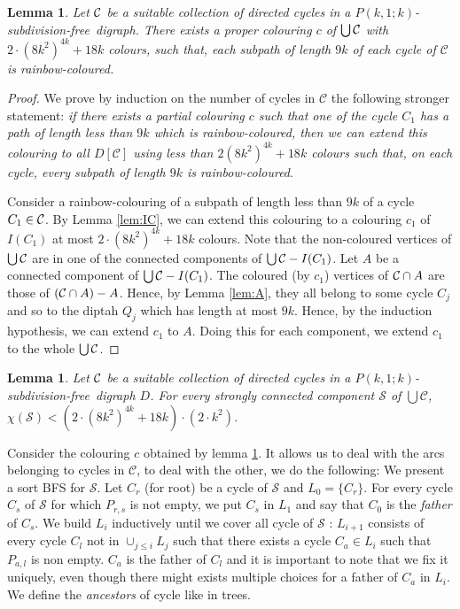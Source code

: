 \documentclass[utf8,11pt]{article}
\theoremstyle{plain}
\newtheorem{lemma}[theorem]{Lemma}
\theoremstyle{definition}
\theoremstyle{remark}
\newcommand{\dr}{ k^2}
\newcommand{\col}{(8k^2)^{4k}}
\newcommand{\free}{subdivision-free}
\begin{document}
\begin{lemma}\label{lem:col-union-cycle}
Let ${\cal C}$ be a suitable collection of directed cycles in a $P(k,1;k)$-\free\ digraph.
There exists a proper colouring $c$ of $\bigcup{\cal C}$ with $2\cdot \col + 18k$ colours, such that, each subpath of length $9k$ of each cycle of $\mathcal{C}$ is rainbow-coloured.
\end{lemma}
\begin{proof}
We prove by induction on the number of cycles in $\mathcal{C}$ the following stronger statement:
{\it if there exists
a partial colouring $c$ such that one of the cycle $C_1$ has a path of length less than $9k$
which is rainbow-coloured, then we can extend this colouring to all $D[\mathcal{C}]$ using less
than $2\col +18k$ colours such that, on each cycle, every subpath of length
$9k$ is rainbow-coloured}.

Consider a rainbow-colouring of a subpath of length less than $9k$ of a cycle $C_1\in {\cal C}$.
By Lemma \ref{lem:IC}, we can extend this colouring to a colouring $c_1$ of $I(C_1)$ at most $2\cdot \col + 18k$ colours.
Note that the non-coloured vertices of $\bigcup{\cal C}$ are in one of the connected components of $\bigcup{\cal C} - I(C_1)$.
Let $A$ be a connected component of $\bigcup{\cal C} - I(C_1)$. The coloured (by $c_1$) vertices of ${\cal C}\cap A$ are those of $({\cal C}\cap A)-A$. Hence, by Lemma \ref{lem:A}, they all belong to some cycle $C_j$ and so to the diptah $Q_j$ which has length at most $9k$.
Hence, by the induction hypothesis, we can extend $c_1$ to $A$. Doing this for each component, we extend $c_1$ to the whole $\bigcup{\cal C}$.
\end{proof}





\begin{lemma}\label{lem:DC}
Let ${\cal C}$ be a suitable collection of directed cycles in a $P(k,1;k)$-\free\ digraph $D$.
For every strongly connected component $\mathcal{S}$ of $\bigcup \mathcal{C}$, 
$\chi(\mathcal{S}) < (2\cdot \col + 18k) \cdot (2 \cdot \dr)$.
\end{lemma}

Consider the colouring $c$ obtained by lemma \ref{lem:col-union-cycle}. It allows us 
to deal with the arcs belonging to cycles in $\mathcal{C}$, to deal with the other, we do the following:
We present a sort BFS for $\mathcal{S}$.
Let $C_r$ (for root) be a cycle of $\mathcal{S}$ and $L_0 = \{C_r\}$. For every cycle $C_s$ of $\mathcal{S}$ for which 
$P_{r,s}$ is not empty, we put $C_s$ in $L_1$ and say that $C_0$ is the \textit{father} of $C_s$. We build $L_i$ inductively
until we cover all cycle of $\mathcal{S}$ : $L_{i+1}$ consists of every cycle $C_l$ not in $\cup_{j \leq i} L_j$ such that 
there exists a cycle $C_a \in L_i$ such that $P_{a,l}$ is non empty. $C_a$ is the father of $C_l$ and it is important to note that we 
fix it uniquely, even though there might exists multiple choices for a father of $C_a$ in $L_i$. We define the \textit{ancestors} of 
cycle like in trees.
\end{document}
